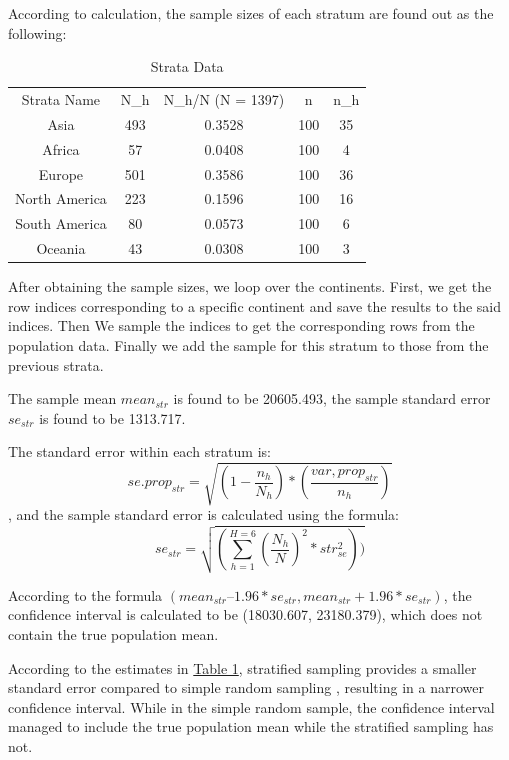\documentclass{article}
\begin{document}
According to calculation, the sample sizes of each stratum are found out as the following:

\begin{table}[h]
    \begin{center}
    \caption{Strata Data}
    \begin{tabular}{c c c c c }
Strata Name & N_h & N_h/N (N = 1397) & n & n_h \\
Asia & 493 & 0.3528 & 100 & 35 \\
Africa & 57 & 0.0408 & 100 & 4 \\
Europe & 501 & 0.3586 & 100 & 36 \\
North America & 223 & 0.1596 & 100 & 16 \\
South America & 80 & 0.0573 & 100 & 6 \\
Oceania & 43 & 0.0308 & 100 & 3
    \end{tabular}
    \label{tab:(c)}
    \end{center}
    \end{table}

After obtaining the sample sizes, we loop over the continents. First, we get the row indices corresponding to a specific continent and save the results to the said indices. Then We sample the indices to get the corresponding rows from the population data. Finally we add the sample for this stratum to those from the previous strata.

The sample mean $mean_{str}$ is found to be 20605.493, the sample standard error $se_{str}$ is found to be 1313.717. 

The standard error within each stratum is: \\
$$se.prop_{str} = \sqrt{(1-\frac{n_h}{N_h}) * (\frac{var,prop_{str}}{n_h})}$$, and the sample standard error is calculated using the formula:\\
$$se_{str} = \sqrt{(\sum_{h=1}^{H = 6}(\frac{N_h}{N})^2*str_{se}^2))}$$ 

According to the formula $(mean_{str} – 1.96*se_{str}, mean_{str} + 1.96*se_{str})$, the confidence interval is calculated to be (18030.607, 23180.379), which does not contain the true population mean. \\


According to the estimates in {\hyperref[tab:(a)]{Table 1}}, stratified sampling provides a smaller standard error compared to simple random sampling , resulting in a narrower confidence interval. While in the simple random sample, the confidence interval managed to include the true population mean while the stratified sampling has not.\\
\end{document}
